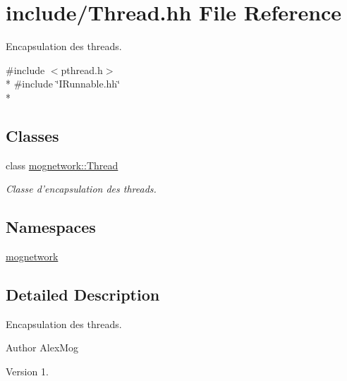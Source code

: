 \hypertarget{_thread_8hh}{\section{include/\-Thread.hh File Reference}
\label{_thread_8hh}
}


Encapsulation des threads.  


{\ttfamily \#include $<$pthread.\-h$>$}\\*
{\ttfamily \#include \char`\"{}I\-Runnable.\-hh\char`\"{}}\\*
\subsection*{Classes}
\begin{DoxyCompactItemize}
\item 
class \hyperlink{classmognetwork_1_1_thread}{mognetwork\-::\-Thread}
\begin{DoxyCompactList}\small\item\em Classe d'encapsulation des threads. \end{DoxyCompactList}\end{DoxyCompactItemize}
\subsection*{Namespaces}
\begin{DoxyCompactItemize}
\item 
\hyperlink{namespacemognetwork}{mognetwork}
\end{DoxyCompactItemize}


\subsection{Detailed Description}
Encapsulation des threads. \begin{DoxyAuthor}{Author}
Alex\-Mog 
\end{DoxyAuthor}
\begin{DoxyVersion}{Version}
1. 
\end{DoxyVersion}
